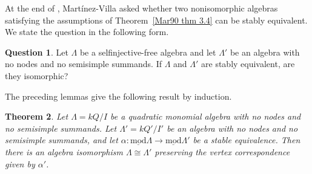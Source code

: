 \documentclass[11pt]{article}
\newcommand{\smod}{\operatorname{\underline{mod}}}
\providecommand{\varLambda}{\Lambda}
\newtheorem{theorem}{Theorem}[section]
\theoremstyle{definition}
\newtheorem{question}[theorem]{Question}
\begin{document}
		At the end of \cite[Section~3]{Mar90}, Mart\'inez-Villa asked whether two nonisomorphic algebras satisfying the assumptions of Theorem~\ref{Mar90 thm 3.4} can be stably equivalent.
		We state the question in the following form.

		\begin{question}\label{question of Martinez-Villa}
			Let $\varLambda$ be a selfinjective-free algebra and let $\varLambda'$ be an algebra with no nodes and no semisimple summands.
			If $\varLambda$ and $\varLambda'$ are stably equivalent, are they isomorphic?
		\end{question}

		The preceding lemmas give the following result by induction.

		\begin{theorem}\label{theorem of quadratic monomial rigidity}\label{theorem of AG rigidity}\label{proposition of conditional labelled induction}
			Let $\varLambda=kQ/I$ be a quadratic monomial algebra with no nodes and no semisimple summands.
			Let $\varLambda'=kQ'/I'$ be an algebra with no nodes and no semisimple summands, and let $\alpha:\smod\varLambda\to\smod\varLambda'$ be a stable equivalence.
			Then there is an algebra isomorphism $\varLambda\cong\varLambda'$ preserving the vertex correspondence given by $\alpha'$.
		\end{theorem}
\end{document}
